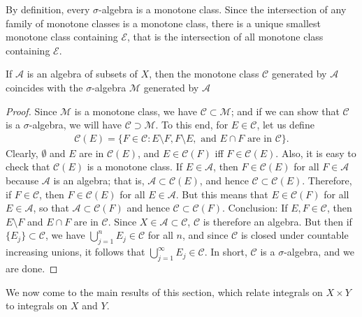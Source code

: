 By definition, every $\sigma$-algebra is a monotone class.
Since the intersection of any family of monotone classes is a monotone class, there is a unique smallest monotone class containing $\mathcal{E}$, that is the intersection of all monotone class containing $\mathcal{E}$.

\begin{lemma}
    If $\mathcal{A}$ is an algebra of subsets of $X$, then the monotone class $\mathcal{C}$ generated by $\mathcal{A}$ coincides with the $\sigma$-algebra $\mathcal{M}$ generated by $\mathcal{A}$
\end{lemma}

\begin{proof}
    Since $\mathcal{M}$ is a monotone class, we have $\mathcal{C} \subset \mathcal{M}$;
    and if we can show that $\mathcal{C}$ is a $\sigma$-algebra, we will have $\mathcal{C} \supset \mathcal{M}$.
    To this end, for $E \in \mathcal{C}$, let us define
    \begin{align}
        \mathcal{C}(E) = \{ F \in \mathcal{C}: E \setminus F, F \setminus E, \text{ and } E \cap F \text{ are in } \mathcal{C} \}.
    \end{align}
    Clearly, $\emptyset$ and $E$ are in $\mathcal{C}(E)$, and $E \in \mathcal{C}(F)$ iff $F \in \mathcal{C}(E)$.
    Also, it is easy to check that $\mathcal{C}(E)$ is a monotone class.
    If $E \in \mathcal{A}$, then $F \in \mathcal{C}(E)$ for all $F \in \mathcal{A}$ because $\mathcal{A}$ is an algebra;
    that is, $\mathcal{A} \subset \mathcal{C}(E)$, and hence $\mathcal{C} \subset \mathcal{C}(E)$.
    Therefore, if $F \in \mathcal{C}$, then $F \in \mathcal{C}(E)$ for all $E \in \mathcal{A}$.
    But this means that $E \in \mathcal{C}(F)$ for all $E \in \mathcal{A}$, so that $\mathcal{A} \subset \mathcal{C}(F)$ and hence $\mathcal{C} \subset \mathcal{C}(F)$.
    Conclusion: If $E, F \in \mathcal{C}$, then $E \setminus F$ and $E \cap F$ are in $\mathcal{C}$.
    Since $X \in \mathcal{A} \subset \mathcal{C}$, $\mathcal{C}$ is therefore an algebra.
    But then if $\{ E_j \} \subset \mathcal{C}$, we have $\bigcup_{j=1}^{n} E_j \in \mathcal{C}$ for all $n$, and since $\mathcal{C}$ is closed under countable increasing unions, it follows that $\bigcup_{j=1}^{\infty} E_j \in \mathcal{C}$.
    In short, $\mathcal{C}$ is a $\sigma$-algebra, and we are done.
\end{proof}

We now come to the main results of this section, which relate integrals on $X \times Y$ to integrals on $X$ and $Y$.


